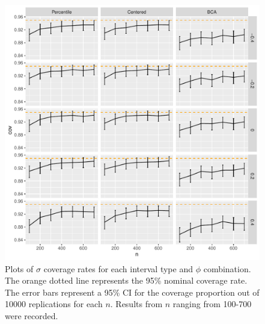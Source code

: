 \documentclass[12pt, letterpaper, titlepage]{article}
\begin{document}
\begin{figure}[tbp]
  \centering
  \includegraphics[width=\textwidth]{figures/plot_sigma}
  \caption{Plots of $\sigma$ coverage rates for each interval type and $\phi$
    combination. The orange dotted line represents the 95\% nominal coverage
    rate. The error bars represent a 95\% CI for the coverage
    proportion out of 10000 replications for each $n$. Results from $n$
    ranging from 100-700 were recorded.}
  \label{fig:sigma}
\end{figure}
\end{document}
